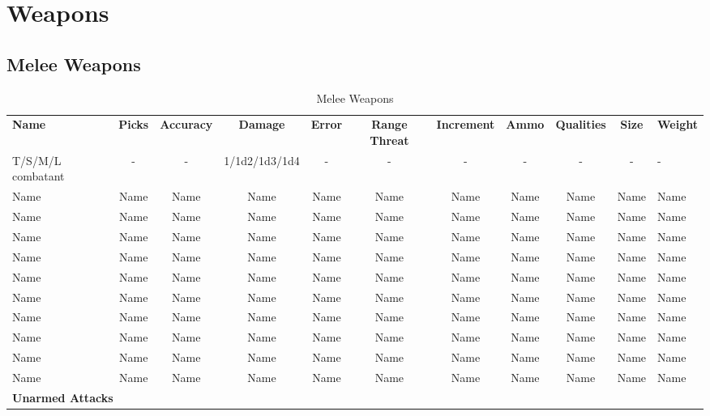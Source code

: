 \chapter{Weapons}

\section{Melee Weapons}

\begin{table}
\caption{Melee Weapons}
\begin{adjustbox}{width=\columnwidth,center}
\begin{tabular}{l c c c c c c c c c l}
\textbf{Name} & \textbf{Picks} & \textbf{Accuracy} & \textbf{Damage} & \textbf{Error} & \textbf{Range Threat} & \textbf{Increment} & \textbf{Ammo} & \textbf{Qualities} & \textbf{Size} & \textbf{Weight}\\

T/S/M/L combatant & - & - & 1/1d2/1d3/1d4 & - & - & - & - & - & - & -\\
Name & Name & Name & Name & Name & Name & Name & Name & Name & Name & Name\\
Name & Name & Name & Name & Name & Name & Name & Name & Name & Name & Name\\
Name & Name & Name & Name & Name & Name & Name & Name & Name & Name & Name\\
Name & Name & Name & Name & Name & Name & Name & Name & Name & Name & Name\\
Name & Name & Name & Name & Name & Name & Name & Name & Name & Name & Name\\
Name & Name & Name & Name & Name & Name & Name & Name & Name & Name & Name\\
Name & Name & Name & Name & Name & Name & Name & Name & Name & Name & Name\\
Name & Name & Name & Name & Name & Name & Name & Name & Name & Name & Name\\
Name & Name & Name & Name & Name & Name & Name & Name & Name & Name & Name\\
Name & Name & Name & Name & Name & Name & Name & Name & Name & Name & Name\\

\multicolumn{11}{l}{\textbf{Unarmed Attacks}}\\

\end{tabular}
\end{adjustbox}
\end{table}

